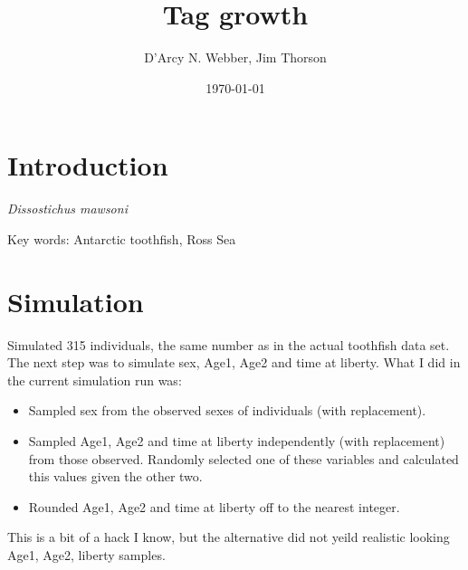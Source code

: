 \documentclass[11pt, a4paper]{article}
\title{Tag growth}
\author{D'Arcy N. Webber, Jim Thorson}
\date{\today}
\begin{document}
\maketitle

\section{Introduction}
\textit{Dissostichus mawsoni}

Key words: Antarctic toothfish, Ross Sea


\section{Simulation}
Simulated 315 individuals, the same number as in the actual toothfish data
set. The next step was to simulate sex, Age1, Age2 and time at liberty. What I
did in the current simulation run was:
\begin{itemize}
\item Sampled sex from the observed sexes of individuals (with replacement).
\item Sampled Age1, Age2 and time at liberty independently (with replacement)
  from those observed. Randomly selected one of these variables and calculated
  this values given the other two.
\item Rounded Age1, Age2 and time at liberty off to the nearest integer.
\end{itemize}
This is a bit of a hack I know, but the alternative did not yeild realistic
looking Age1, Age2, liberty samples.
\end{document}

